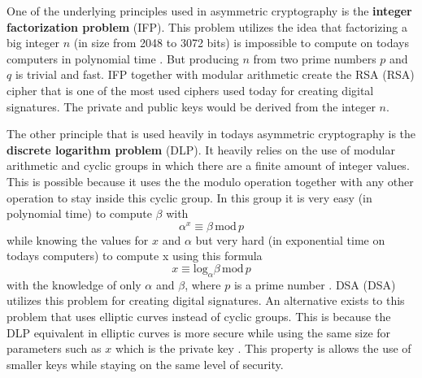 One of the underlying principles used in asymmetric cryptography is the \textbf{integer factorization problem} (\acs{IFP}). This problem utilizes the idea that factorizing a big integer $n$ (in size from 2048 to 3072 bits) is impossible to compute on todays computers in polynomial time \cite{Paar2010}. But producing $n$ from two prime numbers $p$ and $q$ is trivial and fast. IFP together with modular arithmetic create the RSA (\acl{RSA}) cipher that is one of the most used ciphers used today for creating digital signatures. The private and public keys would be derived from the integer $n$.

The other principle that is used heavily in todays asymmetric cryptography is the \textbf{discrete logarithm problem} (\acs{DLP}). It heavily relies on the use of modular arithmetic and cyclic groups in which there are a finite amount of integer values. This is possible because it uses the the modulo operation together with any other operation to stay inside this cyclic group. In this group it is very easy (in polynomial time) to compute $\beta$ with
\begin{equation}
  \alpha^x\equiv\beta\,\mathrm{mod}\,p
\end{equation}
while knowing the values for $x$ and $\alpha$ but very hard (in exponential time on todays computers) to compute x using this formula
\begin{equation}
  x\equiv\mathrm{log}_\alpha\beta\,\mathrm{mod}\,p
\end{equation}
with the knowledge of only $\alpha$ and $\beta$, where $p$ is a prime number \cite{Paar2010}. DSA (\acl{DSA}) utilizes this problem for creating digital signatures. An alternative exists to this problem that uses elliptic curves instead of cyclic groups. This is because the DLP equivalent in elliptic curves is more secure while using the same size for parameters such as $x$ which is the private key \cite{Ristic2014}. This property is allows the use of smaller keys while staying on the same level of security.